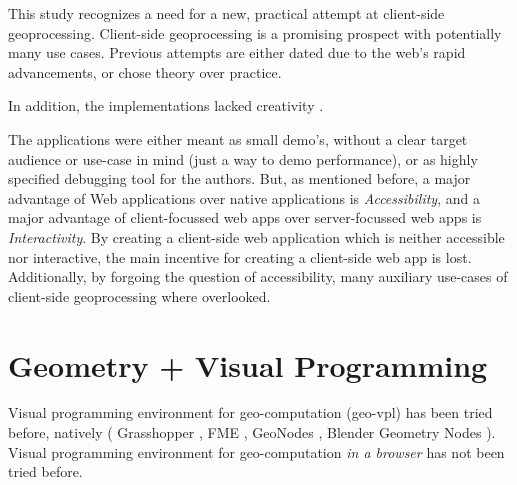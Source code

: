 This study recognizes a need for a new, practical attempt at client-side geoprocessing. 
Client-side geoprocessing is a promising prospect with potentially many use cases.
Previous attempts are either dated due to the web's rapid advancements, or chose theory over practice.

In addition, the implementations lacked creativity . 

The applications were either meant as small demo's, without a clear target audience or use-case in mind (just a way to demo performance), or as highly specified debugging tool for the authors.   
But, as mentioned before, a major advantage of Web applications over native applications is \emph{Accessibility}, and a major advantage of client-focussed web apps over server-focussed web apps is \emph{Interactivity}. 
By creating a client-side web application which is neither accessible nor interactive, the main incentive for creating a client-side web app is lost.
Additionally, by forgoing the question of accessibility, many auxiliary use-cases of client-side geoprocessing where overlooked.


\section{ Geometry + Visual Programming }

Visual programming environment for geo-computation (geo-vpl) has been tried before, natively ( Grasshopper , FME , GeoNodes , Blender Geometry Nodes ). 
Visual programming environment for geo-computation \emph{in a browser} has not been tried before. 




